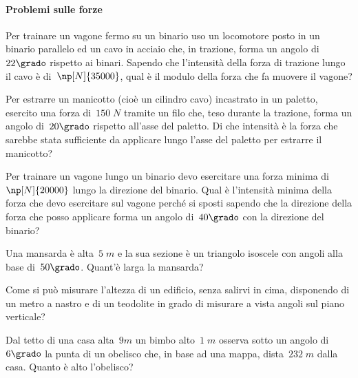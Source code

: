 \paragraph{Problemi sulle forze}

\begin{multicols}{2}
 \begin{esercizio}[\Ast]
\label{ese:C.51}
Per trainare un vagone fermo su un binario uso un locomotore posto in un binario parallelo ed un cavo in acciaio che, in trazione,
forma un angolo di~$22\grado$ rispetto ai binari. Sapendo che l'intensità della forza di trazione lungo il cavo è di~$\np[N]{35000}$,
qual è il modulo della forza che fa muovere il vagone?
\end{esercizio}

\begin{esercizio}[\Ast]
\label{ese:C.52}
Per estrarre un manicotto (cioè un cilindro cavo) incastrato in un paletto, esercito una forza di~$150\;\unit{N}$ tramite un filo che,
teso durante la trazione, forma un angolo di~$20\grado$ rispetto all'asse del paletto. Di che intensità è la forza che sarebbe stata
sufficiente da applicare lungo l'asse del paletto per estrarre il manicotto?
\end{esercizio}

\begin{esercizio}[\Ast]
\label{ese:C.53}
Per trainare un vagone lungo un binario devo esercitare una forza minima di~$\np[N]{20000}$ lungo la direzione del binario.
Qual è l'intensità minima della forza che devo esercitare sul vagone perché si sposti sapendo che la direzione della forza che posso
applicare forma un angolo di~$40\grado$ con la direzione del binario?
\end{esercizio}

\begin{esercizio}[\Ast]
\label{ese:C.54}
Una mansarda è alta~$5\;\unit{m}$ e la sua sezione è un triangolo isoscele con angoli alla base di~$50\grado$. Quant'è larga la mansarda?
\end{esercizio}

\begin{esercizio}
\label{ese:C.55}
Come si può misurare l'altezza di un edificio, senza salirvi in cima, disponendo di un metro a nastro e di un teodolite in grado di
misurare a vista angoli sul piano verticale?
\end{esercizio}

\begin{esercizio}[\Ast]
\label{ese:C.56}
Dal tetto di una casa alta~$9\unit{m}$ un bimbo alto~$1\;\unit{m}$ osserva sotto un angolo di~$6\grado$ la punta di un obelisco che,
in base ad una mappa, dista~$232\;\unit{m}$ dalla casa. Quanto è alto l'obelisco?
\end{esercizio}


\end{multicols}
